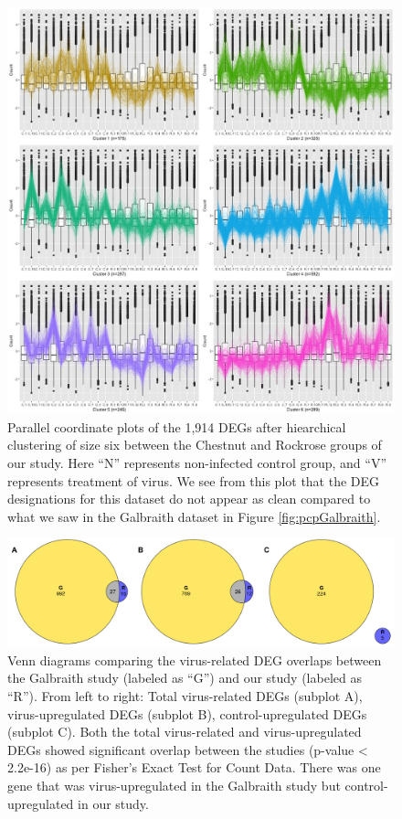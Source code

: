 \documentclass[11pt,a4paper,oldfontcommands,openany]{memoir}
\numberwithin{equation}{section} %
\begin{document}
\begin{figure}[H]
  \includegraphics[width=\textwidth]{../C_R/DESeq2/ClusterStandard/Clustering_data_FDR_05/C_R_6.jpg}
  \caption{Parallel coordinate plots of the 1,914 DEGs after hiearchical clustering of size six between the Chestnut and Rockrose groups of our study. Here ``N'' represents non-infected control group, and ``V'' represents treatment of virus. We see from this plot that the DEG designations for this dataset do not appear as clean compared to what we saw in the Galbraith dataset in Figure \ref{fig:pcpGalbraith}.}
  \label{fig:pcpRutterDiet}
\end{figure}

\begin{figure}[H]
  \includegraphics[width=\textwidth]{Images/GRVenn}
  \caption{Venn diagrams comparing the virus-related DEG overlaps between the Galbraith study (labeled as ``G'') and our study (labeled as ``R''). From left to right: Total virus-related DEGs (subplot A), virus-upregulated DEGs (subplot B), control-upregulated DEGs (subplot C). Both the total virus-related and virus-upregulated DEGs showed significant overlap between the studies (p-value < 2.2e-16) as per Fisher's Exact Test for Count Data. There was one gene that was virus-upregulated in the Galbraith study but control-upregulated in our study.}
  \label{fig:GRVenn}
\end{figure}
\end{document}
